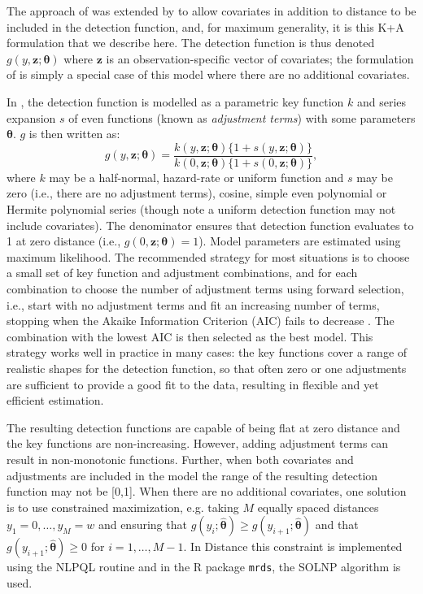 \documentclass[authoryear,preprint,review,12pt]{elsarticle}
\begin{document}
The approach of \cite{Buckland:1992wy} was extended by \cite{Marques:2003vb} to allow covariates in addition to distance to be included in the detection function, and, for maximum generality, it is this K+A formulation that we describe here.  The detection function is thus denoted $g(y, \mathbf{z};\bm{\theta})$ where $\mathbf{z}$ is an observation-specific vector of covariates; the formulation of \cite{Buckland:1992wy} is simply a special case of this model where there are no additional covariates. 

In \cite{Marques:2003vb}, the detection function is modelled as a parametric key function $k$ and series expansion $s$ of even functions (known as \textit{adjustment terms}) with some parameters $\bm{\theta}$. $g$ is then written as:
\begin{equation*}
g(y, \mathbf{z}; \bm{\theta}) = \frac{k(y, \mathbf{z}; \bm{\theta}) \{1+s(y, \mathbf{z}; \bm{\theta})\}}{k(0, \mathbf{z}; \bm{\theta}) \{1+s(0, \mathbf{z}; \bm{\theta})\}},
\end{equation*}
where $k$ may be a half-normal, hazard-rate or uniform function and $s$ may be zero (i.e., there are no adjustment terms), cosine, simple even polynomial or Hermite polynomial series (though note a uniform detection function may not include covariates). The denominator ensures that detection function evaluates to 1 at zero distance (i.e., $g(0, \mathbf{z};\bm{\theta})=1$). Model parameters are estimated using maximum likelihood.  The recommended strategy for most situations is to choose a small set of key function and adjustment combinations, and for each combination to choose the number of adjustment terms using forward selection, i.e., start with no adjustment terms and fit an increasing number of terms, stopping when the Akaike Information Criterion (AIC) fails to decrease  \citep[]{Thomas:2010cf}. The combination with the lowest AIC is then selected as the best model. This strategy works well in practice in many cases: the key functions cover a range of realistic shapes for the detection function, so that often zero or one adjustments are sufficient to provide a good fit to the data, resulting in flexible and yet efficient estimation. 

The resulting detection functions are capable of being flat at zero distance and the key functions are non-increasing. However, adding adjustment terms can result in non-monotonic functions. Further, when both covariates and adjustments are included in the model the range of the resulting detection function may not be [0,1]. When there are no additional covariates, one solution is to use constrained maximization, e.g. taking $M$ equally spaced distances $y_1=0, \ldots , y_{M}=w$ and ensuring that $g(y_i;\bm{\hat{\theta}})\geq g(y_{i+1}; \bm{\hat{\theta}})$ and that $g(y_{i+1};\bm{\hat{\theta}})\geq 0$ for $i=1,\ldots,M-1$. In Distance this constraint is implemented using the NLPQL routine \cite[]{Schittkowski:1986wj} and in the \textsf{R} package \texttt{mrds}, the SOLNP algorithm \citep{Ye:1987wt} is used.
\end{document}
